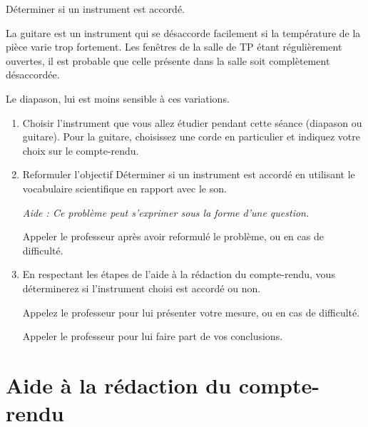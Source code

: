 \documentclass[12pt,a4paper]{article}
\begin{document}
\newpage

\begin{objectif}
Déterminer si un instrument est accordé.
\end{objectif}

La guitare est un instrument qui se désaccorde facilement si la température de la pièce varie trop fortement.
Les fenêtres de la salle de TP étant régulièrement ouvertes, il est probable que celle présente dans la salle soit complètement désaccordée.

Le diapason, lui est moins sensible à ces variations.

\begin{enumerate}
\item Choisir l'instrument que vous allez étudier pendant cette séance (diapason ou guitare).
Pour la guitare, choisissez une corde en particulier et indiquez votre choix sur le compte-rendu.

\item \app{}

Reformuler l'objectif \og Déterminer si un instrument est accordé \fg{}  en utilisant le vocabulaire scientifique en rapport avec le son.

\emph{Aide : Ce problème peut s'exprimer sous la forme d'une question.}

\appelprof{\app}
Appeler le professeur après avoir reformulé le problème, ou en cas de difficulté.

\item \app{} \anarai{} \rea{} \val{} \com{}

En respectant les étapes de l'aide à la rédaction du compte-rendu, vous déterminerez si l'instrument choisi est accordé ou non.

\appelprof{\rea} Appelez le professeur pour lui présenter votre mesure, ou en cas de difficulté.

\appelprof{\val{}} Appeler le professeur pour lui faire part de vos conclusions.

\end{enumerate}

\section*{Aide à la rédaction du compte-rendu}
\end{document}
